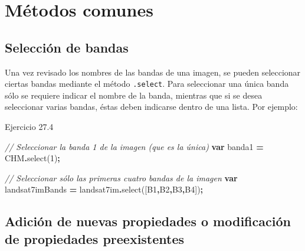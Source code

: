 \documentclass[
  12pt,
  letterpaper,
  twoside]{book}
\newenvironment{Shaded}{\begin{snugshade}}{\end{snugshade}}
\newcommand{\CommentTok}[1]{\textcolor[rgb]{0.56,0.35,0.01}{\textit{#1}}}
\newcommand{\FunctionTok}[1]{\textcolor[rgb]{0.00,0.00,0.00}{#1}}
\newcommand{\KeywordTok}[1]{\textcolor[rgb]{0.13,0.29,0.53}{\textbf{#1}}}
\newcommand{\NormalTok}[1]{#1}
\newcommand{\OperatorTok}[1]{\textcolor[rgb]{0.81,0.36,0.00}{\textbf{#1}}}
\newcommand{\StringTok}[1]{\textcolor[rgb]{0.31,0.60,0.02}{#1}}
\begin{document}
\hypertarget{muxe9todos-comunes-3}{%
\section{Métodos comunes}\label{muxe9todos-comunes-3}}

\hypertarget{selecciuxf3n-de-bandas}{%
\subsection*{Selección de bandas}\label{selecciuxf3n-de-bandas}}

Una vez revisado los nombres de las bandas de una imagen, se pueden seleccionar ciertas bandas mediante el método \texttt{.select}. Para seleccionar una única banda sólo se requiere indicar el nombre de la banda, mientras que si se desea seleccionar varias bandas, éstas deben indicarse dentro de una lista. Por ejemplo:

Ejercicio 27.4

\begin{Shaded}
\begin{Highlighting}[]
\CommentTok{// Seleccionar la banda 1 de la imagen (que es la única)}
\KeywordTok{var}\NormalTok{ banda1 }\OperatorTok{=}\NormalTok{ CHM}\OperatorTok{.}\FunctionTok{select}\NormalTok{(}\StringTok{\textquotesingle{}1\textquotesingle{}}\NormalTok{)}\OperatorTok{;}

\CommentTok{// Seleccionar sólo las primeras cuatro bandas de la imagen}
\KeywordTok{var}\NormalTok{ landsat7imBands }\OperatorTok{=}\NormalTok{ landsat7im}\OperatorTok{.}\FunctionTok{select}\NormalTok{([}\StringTok{\textquotesingle{}B1\textquotesingle{}}\OperatorTok{,}\StringTok{\textquotesingle{}B2\textquotesingle{}}\OperatorTok{,}\StringTok{\textquotesingle{}B3\textquotesingle{}}\OperatorTok{,}\StringTok{\textquotesingle{}B4\textquotesingle{}}\NormalTok{])}\OperatorTok{;}
\end{Highlighting}
\end{Shaded}

\hypertarget{adiciuxf3n-de-nuevas-propiedades-o-modificaciuxf3n-de-propiedades-preexistentes-1}{%
\subsection*{Adición de nuevas propiedades o modificación de propiedades preexistentes}\label{adiciuxf3n-de-nuevas-propiedades-o-modificaciuxf3n-de-propiedades-preexistentes-1}}
\end{document}
